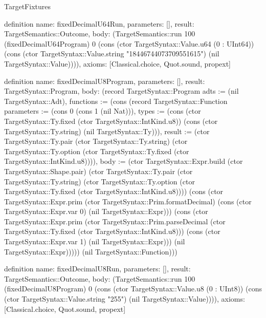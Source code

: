 \begin{lexlean}{TargetFixtures}
\begin{semanticmodule}
definition{
  name: fixedDecimalU64Run,
  parameters: [],
  result: TargetSemantics::Outcome,
  body: (TargetSemantics::run 100 (fixedDecimalU64Program) 0 (cons (ctor TargetSyntax::Value.u64 (0 : UInt64)) (cons (ctor TargetSyntax::Value.string "18446744073709551615") (nil TargetSyntax::Value)))),
  axioms: [Classical.choice, Quot.sound, propext]
}

definition{
  name: fixedDecimalU8Program,
  parameters: [],
  result: TargetSyntax::Program,
  body: (record TargetSyntax::Program {adts := (nil TargetSyntax::Adt), functions := (cons (record TargetSyntax::Function {parameters := (cons 0 (cons 1 (nil Nat))), types := (cons (ctor TargetSyntax::Ty.fixed (ctor TargetSyntax::IntKind.u8)) (cons (ctor TargetSyntax::Ty.string) (nil TargetSyntax::Ty))), result := (ctor TargetSyntax::Ty.pair (ctor TargetSyntax::Ty.string) (ctor TargetSyntax::Ty.option (ctor TargetSyntax::Ty.fixed (ctor TargetSyntax::IntKind.u8)))), body := (ctor TargetSyntax::Expr.build (ctor TargetSyntax::Shape.pair) (ctor TargetSyntax::Ty.pair (ctor TargetSyntax::Ty.string) (ctor TargetSyntax::Ty.option (ctor TargetSyntax::Ty.fixed (ctor TargetSyntax::IntKind.u8)))) (cons (ctor TargetSyntax::Expr.prim (ctor TargetSyntax::Prim.formatDecimal) (cons (ctor TargetSyntax::Expr.var 0) (nil TargetSyntax::Expr))) (cons (ctor TargetSyntax::Expr.prim (ctor TargetSyntax::Prim.parseDecimal (ctor TargetSyntax::Ty.fixed (ctor TargetSyntax::IntKind.u8))) (cons (ctor TargetSyntax::Expr.var 1) (nil TargetSyntax::Expr))) (nil TargetSyntax::Expr))))}) (nil TargetSyntax::Function))})
}

definition{
  name: fixedDecimalU8Run,
  parameters: [],
  result: TargetSemantics::Outcome,
  body: (TargetSemantics::run 100 (fixedDecimalU8Program) 0 (cons (ctor TargetSyntax::Value.u8 (0 : UInt8)) (cons (ctor TargetSyntax::Value.string "255") (nil TargetSyntax::Value)))),
  axioms: [Classical.choice, Quot.sound, propext]
}


\end{semanticmodule}
\end{lexlean}
